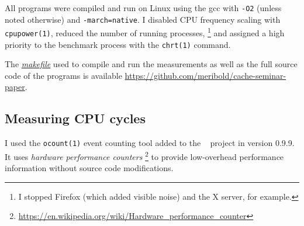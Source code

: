 \begin{comment}
General mitigation/alleviation strategy: take the minimum execution time of \alts{all, a
number of} runs; all noise is additive (TODO: not the one caused by the cache being hot).
\end{comment}

All programs were compiled and run on Linux using the \gls{gcc} with
\texttt{-O2} (unless noted otherwise) and \texttt{-march=native}.
I disabled CPU frequency scaling with \texttt{cpupower(1)},
reduced the number of running processes,%
\footnote{%
   I stopped Firefox (which added visible noise) and the X server, for example.
}
and assigned a high priority to the benchmark process with the \texttt{chrt(1)}
command.

The \emph{\href{https://github.com/meribold/cache-seminar-paper/blob/master/makefile}
{makefile}} used to compile and run the measurements as well as the full source code of
the programs is available 
\url{https://github.com/meribold/cache-seminar-paper}.

\subsection{Measuring CPU cycles}
\label{app:cycles}





I used the \texttt{ocount(1)} event counting tool added to the
~\cite{oprofile} project in version 0.9.9.
%
It uses \emph{hardware performance counters}%
\footnote{%
   \url{https://en.wikipedia.org/wiki/Hardware_performance_counter}
}
to provide low-overhead performance information without source code modifications.


